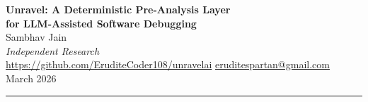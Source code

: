 \documentclass[12pt,a4paper]{article}
\begin{document}

\begin{center}
  {\LARGE\bfseries Unravel: A Deterministic Pre-Analysis Layer\\[6pt]
   for LLM-Assisted Software Debugging}\\[18pt]
  {\large Sambhav Jain}\\[4pt]
  {\small \textit{Independent Research}}\\[2pt]
  {\small \url{https://github.com/EruditeCoder108/unravelai} \quad
          \href{mailto:eruditespartan@gmail.com}{eruditespartan@gmail.com}}\\[4pt]
  {\small March 2026}
\end{center}

\vspace{4pt}
\noindent\textcolor{rulecolor}{\rule{\linewidth}{1pt}}
\vspace{4pt}
\end{document}
